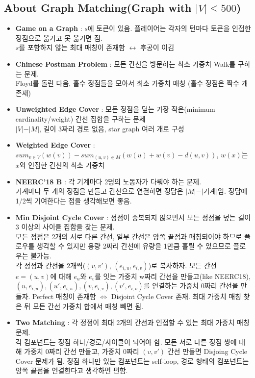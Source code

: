 \documentclass[landscape, 8pt, a4paper, oneside]{extarticle}
\begin{document}
\begin{multicols*}{3}
\subsection{About Graph Matching(Graph with $\vert V \vert \leq 500$)}
\begin{itemize}[noitemsep]
    \item \textbf{Game on a Graph} : $s$에 토큰이 있음. 플레이어는 각자의 턴마다 토큰을 인접한 정점으로 옮기고 못 옮기면 짐.\\
    $s$를 포함하지 않는 최대 매칭이 존재함 $\leftrightarrow$ 후공이 이김
    \item \textbf{Chinese Postman Problem} : 모든 간선을 방문하는 최소 가중치 Walk를 구하는 문제.\\
    Floyd를 돌린 다음, 홀수 정점들을 모아서 최소 가중치 매칭 (홀수 정점은 짝수 개 존재)
    \item \textbf{Unweighted Edge Cover} : 모든 정점을 덮는 가장 작은(minimum cardinality/weight) 간선 집합을 구하는 문제\\
    $\vert V\vert - \vert M\vert$, 길이 3짜리 경로 없음, star graph 여러 개로 구성
    \item \textbf{Weighted Edge Cover} : $sum_{v \in V}(w(v)) - sum_{(u,v) \in M}(w(u) + w(v) - d(u,v))$, $w(x)$는 $x$와 인접한 간선의 최소 가중치
    \item \textbf{NEERC'18 B} : 각 기계마다 2명의 노동자가 다뤄야 하는 문제.\\
    기계마다 두 개의 정점을 만들고 간선으로 연결하면 정답은 $\vert M\vert - \vert\text{기계}\vert$임. 정답에 1/2씩 기여한다는 점을 생각해보면 좋음.
    \item \textbf{Min Disjoint Cycle Cover} : 정점이 중복되지 않으면서 모든 정점을 덮는 길이 3 이상의 사이클 집합을 찾는 문제.\\
    모든 정점은 2개의 서로 다른 간선, 일부 간선은 양쪽 끝점과 매칭되어야 하므로 플로우를 생각할 수 있지만 용량 2짜리 간선에 유량을 1만큼 흘릴 수 있으므로 플로우는 불가능.\\
    각 정점과 간선을 2개씩($(v, v')$, $(e_{i,u},e_{i,v})$)로 복사하자. 모든 간선 $e=(u,v)$에 대해 $e_u$와 $e_v$를 잇는 가중치 w짜리 간선을 만들고(like NEERC18), $(u,e_{i,u}), (u',e_{i,u}), (v,e_{i,v}), (v',e_{i,v})$를 연결하는 가중치 0짜리 간선을 만들자. Perfect 매칭이 존재함 $\Leftrightarrow$ Disjoint Cycle Cover 존재. 최대 가중치 매칭 찾은 뒤 모든 간선 가중치 합에서 매칭 빼면 됨.
    \item \textbf{Two Matching} : 각 정점이 최대 2개의 간선과 인접할 수 있는 최대 가중치 매칭 문제.\\
    각 컴포넌트는 정점 하나/경로/사이클이 되어야 함. 모든 서로 다른 정점 쌍에 대해 가중치 0짜리 간선 만들고, 가중치 0짜리 $(v,v')$ 간선 만들면 Disjoing Cycle Cover 문제가 됨. 정점 하나만 있는 컴포넌트는 self-loop, 경로 형태의 컴포넌트는 양쪽 끝점을 연결한다고 생각하면 편함.
\end{itemize}


\end{multicols*}
\end{document}
